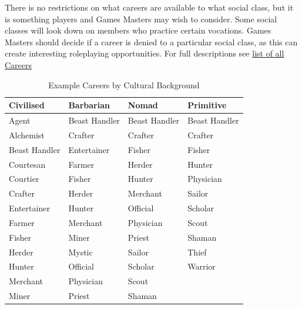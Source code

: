 \documentclass[10pt]{article}
\begin{document}
There is no restrictions on what careers are available to what social class, but it is something players and Games Masters may wish to consider. Some social classes will look down on members who practice certain vocations. Games Masters should decide if a career is denied to a particular social class, as this can create interesting roleplaying opportunities.
For full descriptions see \hyperref[sec:all_careers]{list of all Careers}

\vspace{0.3cm}

\begin{table}[h!]
    \centering
    \caption{Example Careers by Cultural Background}
    \label{tab:culture-careers}
    \small
    \begin{tabular}{|p{3cm}|p{3cm}|p{3cm}|p{3cm}|}
        \hline
        \textbf{Civilised} & \textbf{Barbarian} & \textbf{Nomad} & \textbf{Primitive} \\
        \hline
        Agent              & Beast Handler      & Beast Handler  & Beast Handler      \\
        Alchemist          & Crafter            & Crafter        & Crafter            \\
        Beast Handler      & Entertainer        & Fisher         & Fisher             \\
        Courtesan          & Farmer             & Herder         & Hunter             \\
        Courtier           & Fisher             & Hunter         & Physician          \\
        Crafter            & Herder             & Merchant       & Sailor             \\
        Entertainer        & Hunter             & Official       & Scholar            \\
        Farmer             & Merchant           & Physician      & Scout              \\
        Fisher             & Miner              & Priest         & Shaman             \\
        Herder             & Mystic             & Sailor         & Thief              \\
        Hunter             & Official           & Scholar        & Warrior            \\
        Merchant           & Physician          & Scout          &                    \\
        Miner              & Priest             & Shaman         &                    \\

\end{tabular}
\end{table}
\end{document}
